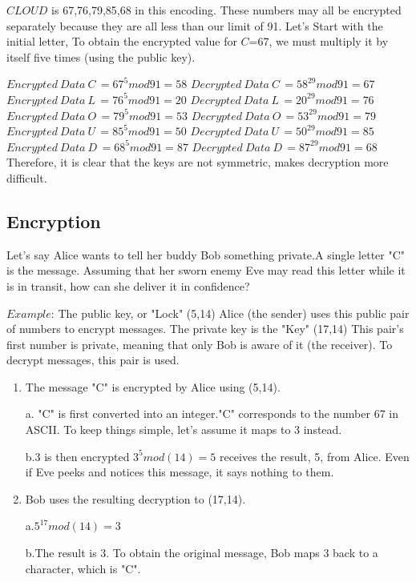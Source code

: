 \documentclass{article}
\begin{document}
$CLOUD$ is 67,76,79,85,68 in this encoding. These numbers may all be encrypted separately because they are all less than our limit of 91. Let's Start with the initial letter,
To obtain the encrypted value for $C$=67, we must multiply it by itself five times (using the public key).

\begin{centre}
\hspace{0.8cm}
\end{centre}


\(Encrypted\:Data\:C\,=67^5mod91=58\) \hspace{0.6cm} \(Decrypted\:Data \:C\,=58^{29}mod91=67\)\\
\(Encrypted\: Data\: L\,=76^5mod91=20\) \hspace{0.6cm} \(Decrypted\:Data \:L\,=20^{29}mod91=76\)\\
\(Encrypted\: Data \:O\,=79^5mod91=53\) \hspace{0.6cm} \(Decrypted\:Data \:O\,=53^{29}mod91=79\)\\
\(Encrypted\: Data\: U\,=85^5mod91=50\) \hspace{0.6cm}\(Decrypted\:Data \:U\,=50^{29}mod91=85\)\\
\(Encrypted \:Data\: D\,=68^5mod91=87\) \hspace{0.6cm} \(Decrypted\:Data \:D\,=87^{29}mod91=68\)\\

Therefore, it is clear that the keys are not symmetric, makes decryption more difficult.
\subsection{Encryption}
Let's say Alice wants to tell her buddy Bob something private.A single letter "C" is the message.
Assuming that her sworn enemy Eve may read this letter while it is in transit, how can she deliver it in confidence?

$Example$:
The public key, or "Lock" (5,14)
Alice (the sender) uses this public pair of numbers to encrypt messages.
The private key is the "Key"
(17,14)
This pair's first number is private, meaning that only Bob is aware of it (the receiver).
To decrypt messages, this pair is used.
\begin{enumerate}
  \item The message "C" is encrypted by Alice using (5,14).

a. "C" is first converted into an integer."C" corresponds to the number 67 in ASCII.
To keep things simple, let's assume it maps to 3 instead.

b.3 is then encrypted \(3^5mod(14)=5\)
  \itemBob receives the result, 5, from Alice. Even if Eve peeks and notices this message, it says nothing to them.
  \item Bob uses the resulting decryption to (17,14).

a.\:\(5^{17}mod(14)=3\)

b.The result is 3.
To obtain the original message, Bob maps 3 back to a character, which is "C".
\end{enumerate}
\end{document}

